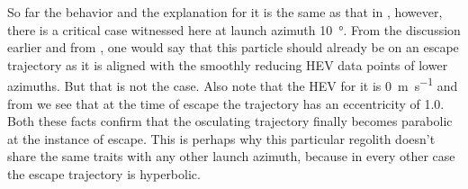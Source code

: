 %
\newline\newline
%
So far the behavior and the explanation for it is the same as that in , however, there is a critical case witnessed here at launch azimuth \SI{10}{\degree}. From the discussion earlier and from , one would say that this particle should already be on an escape trajectory as it is aligned with the smoothly reducing \gls{HEV} data points of lower azimuths. But that is not the case. Also note that the \gls{HEV} for it is \SI{0}{\metre\per\second} and from  we see that at the time of escape the trajectory has an eccentricity of 1.0. Both these facts confirm that the osculating trajectory finally becomes parabolic at the instance of escape. This is perhaps why this particular regolith doesn't share the same traits with any other launch azimuth, because in every other case the escape trajectory is hyperbolic.
